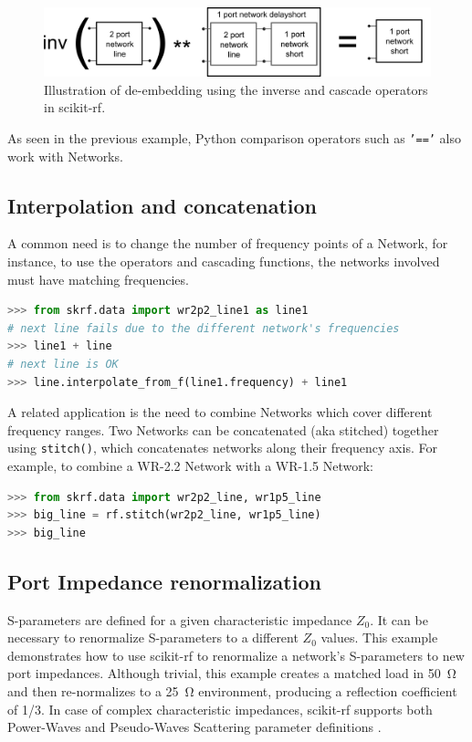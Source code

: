 \documentclass{IEEEjmw}
\begin{document}
\begin{figure}
	\centering
	\includegraphics[width=0.95\linewidth]{figures/deembedding}
	\caption{Illustration of de-embedding using the inverse and cascade operators in scikit-rf.}
	\label{fig:deembedding}
\end{figure}

As seen in the previous example, Python comparison operators such as \texttt{'=='} also work with Networks. 

\subsection{Interpolation and concatenation}
A common need is to change the number of frequency points of a Network, for instance, to use the operators and cascading functions, the networks involved must have matching frequencies.

\begin{lstlisting}[language=Python]
>>> from skrf.data import wr2p2_line1 as line1
# next line fails due to the different network's frequencies
>>> line1 + line 
# next line is OK
>>> line.interpolate_from_f(line1.frequency) + line1  
\end{lstlisting}

A related application is the need to combine Networks which cover different frequency ranges. Two Networks can be concatenated (aka stitched) together using \texttt{stitch()}, which concatenates networks along their frequency axis. For example, to combine a WR-2.2 Network with a WR-1.5 Network:

\begin{lstlisting}[language=Python]
>>> from skrf.data import wr2p2_line, wr1p5_line
>>> big_line = rf.stitch(wr2p2_line, wr1p5_line)
>>> big_line
\end{lstlisting}

\subsection{Port Impedance renormalization}
S-parameters are defined for a given characteristic impedance $Z_0$. It can be necessary to renormalize S-parameters to a different $Z_0$ values. This example demonstrates how to use scikit-rf to renormalize a network's S-parameters to new port impedances. Although trivial, this example creates a matched load in \SI{50}{\ohm} and then re-normalizes to a \SI{25}{\ohm} environment, producing a reflection coefficient of 1/3. In case of complex characteristic impedances, scikit-rf supports both Power-Waves and Pseudo-Waves Scattering parameter definitions \cite{williams2013}.
\end{document}
